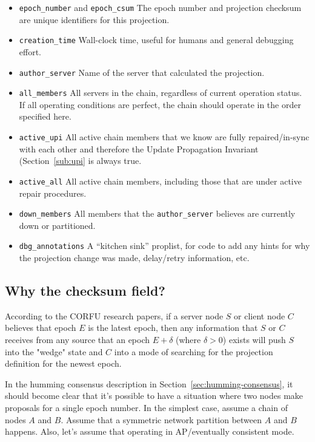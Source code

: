 \documentclass[preprint,10pt]{sigplanconf}
\begin{document}
\begin{itemize}
\item {\tt epoch\_number} and {\tt epoch\_csum} The epoch number and
  projection checksum are unique identifiers for this projection.
\item {\tt creation\_time} Wall-clock time, useful for humans and
  general debugging effort.
\item {\tt author\_server} Name of the server that calculated the projection.
\item {\tt all\_members} All servers in the chain, regardless of current
  operation status.  If all operating conditions are perfect, the
  chain should operate in the order specified here.
\item {\tt active\_upi} All active chain members that we know are
  fully repaired/in-sync with each other and therefore the Update
  Propagation Invariant (Section~\ref{sub:upi} is always true.
\item {\tt active\_all} All active chain members, including those that
  are under active repair procedures.
\item {\tt down\_members} All members that the {\tt author\_server}
  believes are currently down or partitioned.
\item {\tt dbg\_annotations} A ``kitchen sink'' proplist, for code to
  add any hints for why the projection change was made, delay/retry
  information, etc.
\end{itemize}

\subsection{Why the checksum field?}

According to the CORFU research papers, if a server node $S$ or client
node $C$ believes that epoch $E$ is the latest epoch, then any information
that $S$ or $C$ receives from any source that an epoch $E+\delta$ (where
$\delta > 0$) exists will push $S$ into the "wedge" state and $C$ into a mode
of searching for the projection definition for the newest epoch.

In the humming consensus description in
Section~\ref{sec:humming-consensus}, it should become clear that it's
possible to have a situation where two nodes make proposals
for a single epoch number.  In the simplest case, assume a chain of
nodes $A$ and $B$.  Assume that a symmetric network partition between
$A$ and $B$ happens. Also, let's assume that operating in
AP/eventually consistent mode.
\end{document}
